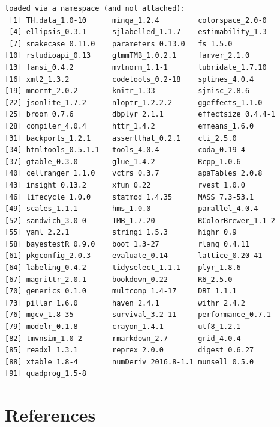 \documentclass[
  english,
]{book}
\begin{document}
\begin{verbatim}
loaded via a namespace (and not attached):
 [1] TH.data_1.0-10      minqa_1.2.4         colorspace_2.0-0   
 [4] ellipsis_0.3.1      sjlabelled_1.1.7    estimability_1.3   
 [7] snakecase_0.11.0    parameters_0.13.0   fs_1.5.0           
[10] rstudioapi_0.13     glmmTMB_1.0.2.1     farver_2.1.0       
[13] fansi_0.4.2         mvtnorm_1.1-1       lubridate_1.7.10   
[16] xml2_1.3.2          codetools_0.2-18    splines_4.0.4      
[19] mnormt_2.0.2        knitr_1.33          sjmisc_2.8.6       
[22] jsonlite_1.7.2      nloptr_1.2.2.2      ggeffects_1.1.0    
[25] broom_0.7.6         dbplyr_2.1.1        effectsize_0.4.4-1 
[28] compiler_4.0.4      httr_1.4.2          emmeans_1.6.0      
[31] backports_1.2.1     assertthat_0.2.1    cli_2.5.0          
[34] htmltools_0.5.1.1   tools_4.0.4         coda_0.19-4        
[37] gtable_0.3.0        glue_1.4.2          Rcpp_1.0.6         
[40] cellranger_1.1.0    vctrs_0.3.7         apaTables_2.0.8    
[43] insight_0.13.2      xfun_0.22           rvest_1.0.0        
[46] lifecycle_1.0.0     statmod_1.4.35      MASS_7.3-53.1      
[49] scales_1.1.1        hms_1.0.0           parallel_4.0.4     
[52] sandwich_3.0-0      TMB_1.7.20          RColorBrewer_1.1-2 
[55] yaml_2.2.1          stringi_1.5.3       highr_0.9          
[58] bayestestR_0.9.0    boot_1.3-27         rlang_0.4.11       
[61] pkgconfig_2.0.3     evaluate_0.14       lattice_0.20-41    
[64] labeling_0.4.2      tidyselect_1.1.1    plyr_1.8.6         
[67] magrittr_2.0.1      bookdown_0.22       R6_2.5.0           
[70] generics_0.1.0      multcomp_1.4-17     DBI_1.1.1          
[73] pillar_1.6.0        haven_2.4.1         withr_2.4.2        
[76] mgcv_1.8-35         survival_3.2-11     performance_0.7.1  
[79] modelr_0.1.8        crayon_1.4.1        utf8_1.2.1         
[82] tmvnsim_1.0-2       rmarkdown_2.7       grid_4.0.4         
[85] readxl_1.3.1        reprex_2.0.0        digest_0.6.27      
[88] xtable_1.8-4        numDeriv_2016.8-1.1 munsell_0.5.0      
[91] quadprog_1.5-8     
\end{verbatim}

\hypertarget{refs}{%
\chapter*{References}\label{refs}}

  
\end{document}
